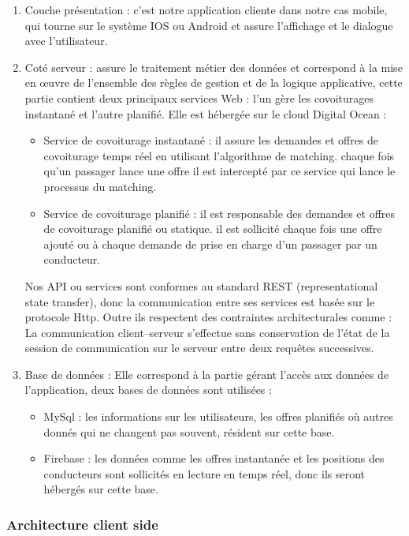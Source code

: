 \begin{enumerate}
	\item Couche présentation : c'est notre application cliente dans notre cas mobile, qui tourne sur le système IOS ou Android et assure l'affichage et le dialogue avec l'utilisateur.
	\item Coté serveur : assure le traitement métier des données et correspond à la mise en œuvre de l'ensemble des règles de gestion et de la logique applicative, cette partie contient deux principaux services Web : l'un gère les covoiturages instantané et l'autre planifié. Elle est hébergée sur le cloud Digital Ocean :
	\begin{itemize}
		\item Service de covoiturage instantané : il assure les demandes et offres de covoiturage temps réel en utilisant l'algorithme de matching. chaque fois qu'un passager lance une offre il est intercepté par ce service qui lance le processus du matching. 
		\item Service de covoiturage planifié : il est responsable des demandes et offres de covoiturage planifié ou statique. il est sollicité chaque fois une offre ajouté ou à chaque demande de prise en charge d'un passager par un conducteur.
	\end{itemize}
	Nos API ou services sont conformes au standard REST (representational state transfer), donc la communication entre ses services est basée sur le protocole Http. Outre ils respectent des contraintes architecturales comme : La communication client–serveur s'effectue sans conservation de l'état de la session de communication sur le serveur entre deux requêtes successives.\cite{fielding2000architectural}
	\item Base de données : Elle correspond à la partie gérant l'accès aux données de l'application, deux bases de données sont utilisées :
	\begin{itemize}
		\item MySql : les informations sur les utilisateurs, les offres planifiés où autres donnés qui ne changent pas souvent, résident sur cette base.
		\item Firebase : les données comme les offres instantanée et les positions des conducteurs sont sollicités en lecture en temps réel, donc ils seront hébergés sur cette base.
	\end{itemize}
\end{enumerate}
\subsubsection{Architecture client side}
